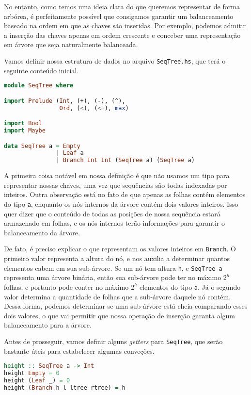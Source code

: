 \documentclass[a4paper]{article}
\begin{document}
No entanto, como temos uma ideia clara do que queremos representar de forma arbórea, é perfeitamente possível que consigamos garantir um balanceamento baseado na ordem em que as chaves são inseridas.
Por exemplo, podemos admitir a inserção das chaves apenas em ordem crescente e conceber uma representação em árvore que seja naturalmente balanceada.

Vamos definir nossa estrutura de dados no arquivo \texttt{SeqTree.hs}, que terá o seguinte conteúdo inicial.

\begin{lstlisting}[language=haskell, frame=single]
module SeqTree where

import Prelude (Int, (+), (-), (^),
                Ord, (<), (<=), max)

import Bool
import Maybe

data SeqTree a = Empty
               | Leaf a
               | Branch Int Int (SeqTree a) (SeqTree a)
\end{lstlisting}

A primeira coisa notável em nossa definição é que não usamos um tipo para representar nossas chaves, uma vez que sequências são todas indexadas por inteiros.
Outra observação está no fato de que apenas as folhas contém elementos do tipo \texttt{a}, enquanto os nós internos da árvore contém dois valores inteiros.
Isso quer dizer que o conteúdo de todas as posições de nossa sequência estará armazenado em folhas, e os nós internos terão informações para garantir o balanceamento da árvore.

De fato, é preciso explicar o que representam os valores inteiros em \texttt{Branch}.
O primeiro valor representa a altura do nó, e nos auxilia a determinar quantos elementos cabem em sua sub-árvore.
Se um nó tem altura \texttt{h}, e \texttt{SeqTree a} representa uma árvore binária, então sua sub-árvore pode ter no máximo $2^h$ folhas, e portanto pode conter no máximo $2^h$ elementos do tipo \texttt{a}.
Já o segundo valor determina a quantidade de folhas que a sub-árvore daquele nó contém.
Dessa forma, podemos determinar se uma sub-árvore está cheia comparando esses dois valores, o que vai permitir que nossa operação de inserção garanta algum balanceamento para a árvore.

Antes de prosseguir, vamos definir alguns \emph{getters} para \texttt{SeqTree}, que serão bastante úteis para estabelecer algumas conveções.

\begin{lstlisting}[language=haskell, frame=single]
height :: SeqTree a -> Int
height Empty = 0
height (Leaf _) = 0
height (Branch h l ltree rtree) = h
\end{lstlisting}
\end{document}

